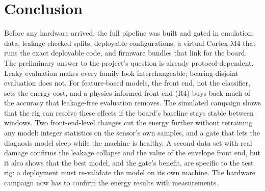 \section{Conclusion}
Before any hardware arrived, the full pipeline was built and gated in emulation: data, leakage-checked splits,
\NumConfigs{} deployable configurations, a virtual Cortex-M4 that runs the exact deployable code, and firmware bundles
that link for the board. The preliminary answer to the project's question is already protocol-dependent. Leaky
evaluation makes every family look interchangeable; bearing-disjoint evaluation does not. For feature-based models,
the front end, not the classifier, sets the energy cost, and a physics-informed front end (R4) buys back much of the
accuracy that leakage-free evaluation removes. The simulated campaign shows that the rig can resolve these effects if
the board's baseline stays stable between windows. Two front-end-level changes cut the energy further without
retraining any model: integer statistics on the sensor's own samples, and a gate that lets the diagnosis model sleep
while the machine is healthy. A second data set with real damage confirms the leakage collapse and the value of the
envelope front end, but it also shows that the best model, and the gate's benefit, are specific to the test rig: a
deployment must re-validate the model on its own machine. The hardware campaign now has to confirm the energy
results with measurements.


